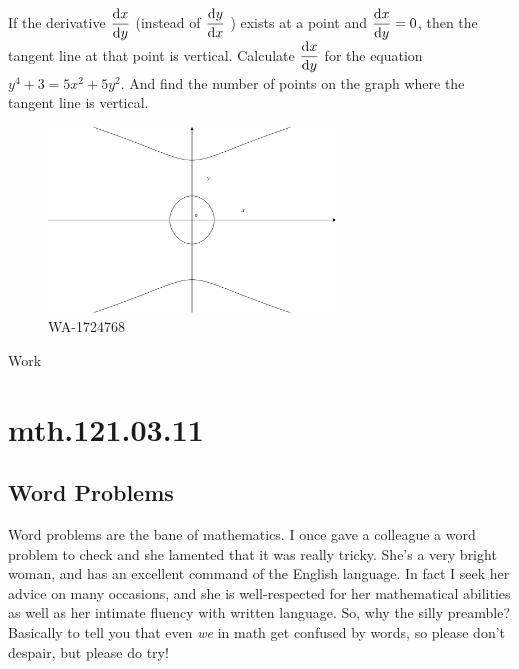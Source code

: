 \documentclass[12pt,addpoints, answers, fleqn]{exam}
\begin{document}
\begin{teacher}
\begin{questions}
If the derivative 
$\displaystyle \frac{{\rm{d}}x}{{\rm{d}}y}$
 (instead of 
$\displaystyle \frac{{\rm{d}}y}{{\rm{d}}x}$
)
 exists at a point and 
$\displaystyle \frac{{\rm{d}}x}{{\rm{d}}y}=0$,
 then the tangent line at that point is vertical. Calculate 
$\displaystyle \frac{{\rm{d}}x}{{\rm{d}}y}$
 for the equation 
$y^4 + 3 = 5x^2 + 5y^2$. And find the number of points on the graph where the tangent line is vertical.
 \begin{figure}[htbp] %
   \centering
   \includegraphics[width=3in]{./graphics/1724768.pdf} 
   \caption{WA-1724768}
   \label{fig:1724768}
\end{figure}
\begin{solution}
Work
\end{solution}
\end{questions}
\end{teacher}
\vfill
\pagebreak

\section{mth.121.03.11}
\subsection{Word Problems}

Word problems are the bane of mathematics. I once gave a colleague a word problem to check and she lamented that it was really tricky. She's a very bright woman, and has an excellent command of the English language. In fact I seek her advice on many occasions, and she is well-respected for her mathematical abilities as well as her intimate fluency with written language. So, why the silly preamble? Basically to tell you that even \emph{we} in math get confused by words, so please don't despair, but please do try!
\end{document}

